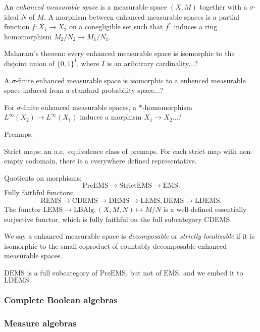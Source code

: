 \documentclass{../../large}
\begin{document}
\begin{prb}
An \emph{enhanced measurable space} is a measurable space $(X,M)$ together with a $\sigma$-ideal $N$ of $M$.
A morphism between enhanced measurable spaces is a partial function $f:X_1\to X_2$ on a conegligible set such that $f^*$ induces a ring homomorphism $M_2/N_2\to M_1/N_1$.
\begin{parts}
\item Maharam's theoem: every enhanced measurable space is isomorphic to the disjoint union of $\{0,1\}^I$, where $I$ is an aribitrary cardinality...?
\item A $\sigma$-finite enhanced measurable space is isomorphic to a enhenced measurable space induced from a standard probability space...?
\item For $\sigma$-finite enhanced measurable spaces, a $*$-homomorphism $L^\infty(X_2)\to L^\infty(X_1)$ induces a morphism $X_1\to X_2$...?
\end{parts}
\end{prb}


Premaps: 

Strict maps: an a.e.~equivalence class of premaps. For each strict map with non-empty codomain, there is a everywhere defined representative.


Quotients on morphisms:
\[\mathrm{PreEMS}\to\mathrm{StrictEMS}\to\mathrm{EMS}.\]
Fully faithful functors:
\[\mathrm{REMS}\to\mathrm{CDEMS}\to\mathrm{DEMS}\to\mathrm{LEMS}, \mathrm{DEMS}\to\mathrm{LDEMS}.\]
The functor $\mathrm{LEMS}\to\mathrm{LBAlg}:(X,M,N)\mapsto M/N$ is a well-defined essentially surjective functor, which is fully faithful on the full subcategory $\mathrm{CDEMS}$.

We say a enhanced measurable space is \emph{decomposable} or \emph{strictly localizable} if it is isomorphic to the small coproduct of countably decomposable enhanced measurable spaces.

$\mathrm{DEMS}$ is a full subcategory of $\mathrm{PreEMS}$, but not of $\mathrm{EMS}$, and we embed it to $\mathrm{LDEMS}$




\subsubsection*{Complete Boolean algebras}





\subsubsection*{Measure algebras}
\end{document}
